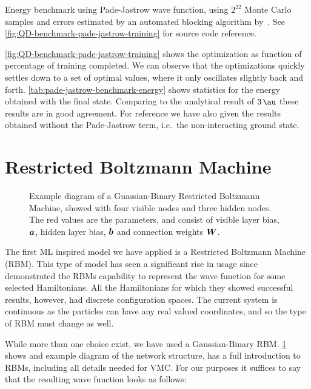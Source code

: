 \documentclass[Thesis.tex]{subfiles}
\begin{document}
\begin{table}[h]
  \centering
  
  \caption{Energy benchmark using Pade-Jastrow wave function, using $2^{22}$
    Monte Carlo samples and errors estimated by an automated blocking algorithm
    by~\textcite{Jonsson-2018}. See \cref{fig:QD-benchmark-pade-jastrow-training}
    for source code reference.}
  \label{tab:pade-jastrow-benchmark-energy}
\end{table}

\cref{fig:QD-benchmark-pade-jastrow-training} shows the optimization as function
of percentage of training completed. We can observe that the optimizations
quickly settles down to a set of optimal values, where it only oscillates
slightly back and forth. \cref{tab:pade-jastrow-benchmark-energy} shows
statistics for the energy obtained with the final state. Comparing to the
analytical result of $\SI{3}{\au}$ these results are in good agreement. For
reference we have also given the results obtained without the Pade-Jastrow term,
i.e.\ the non-interacting ground state.

\section{Restricted Boltzmann Machine}

\begin{figure}[h]
  \centering
  
  \caption{Example diagram of a Guassian-Binary Restricted Boltzmann Machine, showed with four visible nodes
    and three hidden nodes. The red values are the parameters, and consist of
    visible layer bias, $\bm{a}$, hidden layer bias, $\bm{b}$ and connection
    weights $\bm{W}$.}
  \label{fig:rbm-diagram-example}
\end{figure}


The first ML inspired model we have applied is a Restricted Boltzmann Machine (RBM).
This type of model has seen a significant rise in usage
since~\textcite{Carleo602} demonstrated the RBMs capability to
represent the wave function for some selected Hamiltonians. All the
Hamiltonians for which they showed successful results, however, had discrete
configuration spaces. The current system is continuous as the particles can have
any real valued coordinates, and so the type of RBM must change as well.

While more than one choice exist, we have used a Gaussian-Binary RBM\@.
\cref{fig:rbm-diagram-example} shows and example diagram of the network
structure. \textcite{Flugsrud-2018} has a full introduction to RBMs, including
all details needed for VMC\@. For our purposes it suffices to say that the
resulting wave function looks as follows:
\end{document}
